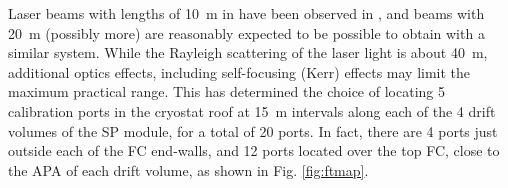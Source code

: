 



Laser beams with lengths of \num{10}~m in  have been observed in , and beams with \num{20}~m (possibly more) are reasonably expected to be possible to obtain with a similar system. While the Rayleigh scattering of the laser light is about \SI{40}{\m}, additional optics effects, including self-focusing (Kerr) effects may limit the maximum practical range.
This has determined the choice of locating 5 calibration ports in the cryostat roof at \num{15}~m intervals along each of the 4 drift volumes of the SP module, for a total of 20 ports. In fact, there are 4 ports just outside each of the FC end-walls, and 12 ports located over the top FC, close to the APA of each drift volume, as shown in Fig. \ref{fig:ftmap}.


